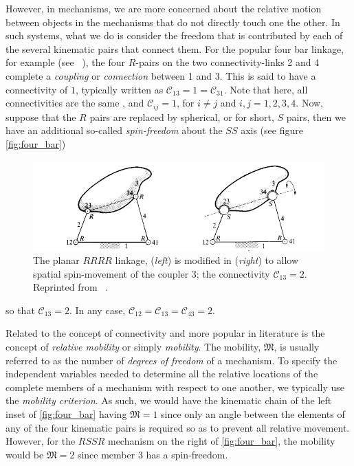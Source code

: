 However, in mechanisms, we are more concerned about the relative motion between objects in the mechanisms that do not directly touch one the other. In such systems, what we do is consider the freedom that is contributed by each of the several kinematic pairs that connect them. For the popular four bar linkage, for example (see ~\cite{MurrayBook}), the four $R$-pairs on the two connectivity-links 2 and 4 complete a \textit{coupling} or \textit{connection} between 1 and 3. This is said to have a connectivity of $1$, typically written as $\mathscr{C}_{13}=1= \mathscr{C}_{31}$. Note that here, all connectivities are the same , and $\mathscr{C}_{ij} = 1$, for $i \neq j$ and $i,j=1,2,3,4$. Now, suppose that the $R$ pairs are replaced by spherical, or for short, $S$ pairs, then we have an additional so-called \textit{spin-freedom} about the $SS$ axis (see figure \autoref{fig:four_bar})
%
\begin{figure}[tb!]
	\centering
	\includegraphics[width=\columnwidth]{figures/four-bar-linkage.png}
	\caption{The planar $RRRR$ linkage, (\textit{left}) is modified in (\textit{right}) to allow spatial spin-movement of the coupler 3; the connectivity $\mathscr{C}_{13}=2$. Reprinted from ~\cite{HuntBook1977}.}
	\label{fig:four_bar}
\end{figure}
%
so that $\mathscr{C}_{13}=2$. In any case, $\mathscr{C}_{12}=\mathscr{C}_{13}=\mathscr{C}_{43} = 2$.

Related to the concept of connectivity and more popular in literature is the concept of \textit{relative mobility} or simply \textit{mobility}.  The mobility, $\mathfrak{M}$, is usually referred to as the number of \textit{degrees of freedom} of a mechanism. To specify the independent variables needed to determine all the relative locations of the complete members of a mechanism with respect to one another, we typically use the \textit{mobility criterion}. As such, we would have the kinematic chain of the left inset of \autoref{fig:four_bar} having $\mathfrak{M}=1$ since only an angle between the elements of any of the four kinematic pairs is required so as to prevent all relative movement. However, for the $RSSR$ mechanism on the right of \autoref{fig:four_bar}, the mobility would be $\mathfrak{M}=2$ since member $3$ has a spin-freedom.

